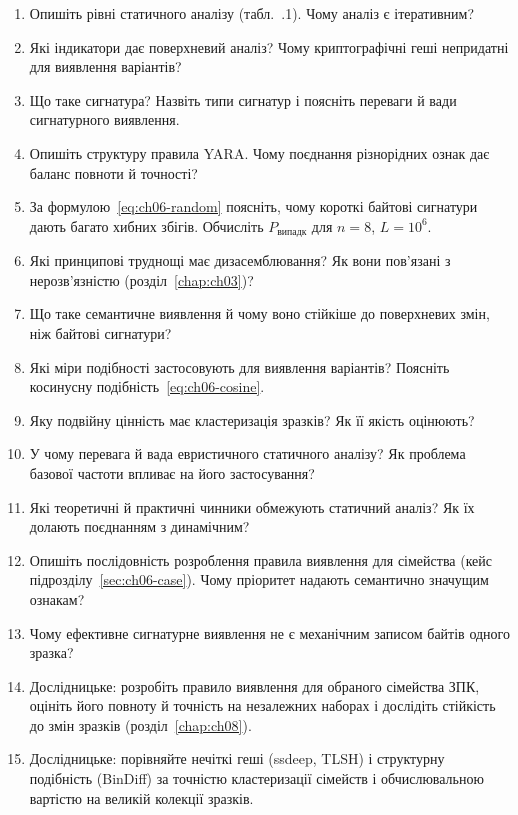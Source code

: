 \selfcheck
\begin{enumerate}
\item Опишіть рівні статичного аналізу (табл.~\thechapter.1). Чому аналіз є ітеративним?
\item Які індикатори дає поверхневий аналіз? Чому криптографічні геші непридатні для виявлення варіантів?
\item Що таке сигнатура? Назвіть типи сигнатур і поясніть переваги й вади сигнатурного виявлення.
\item Опишіть структуру правила YARA. Чому поєднання різнорідних ознак дає баланс повноти й точності?
\item За формулою~\eqref{eq:ch06-random} поясніть, чому короткі байтові сигнатури дають багато хибних збігів. Обчисліть $P_{\text{випадк}}$ для $n=8$, $L=10^6$.
\item Які принципові труднощі має дизасемблювання? Як вони пов'язані з нерозв'язністю (розділ~\ref{chap:ch03})?
\item Що таке семантичне виявлення й чому воно стійкіше до поверхневих змін, ніж байтові сигнатури?
\item Які міри подібності застосовують для виявлення варіантів? Поясніть косинусну подібність~\eqref{eq:ch06-cosine}.
\item Яку подвійну цінність має кластеризація зразків? Як її якість оцінюють?
\item У чому перевага й вада евристичного статичного аналізу? Як проблема базової частоти впливає на його застосування?
\item Які теоретичні й практичні чинники обмежують статичний аналіз? Як їх долають поєднанням з динамічним?
\item Опишіть послідовність розроблення правила виявлення для сімейства (кейс підрозділу~\ref{sec:ch06-case}). Чому пріоритет надають семантично значущим ознакам?
\item Чому ефективне сигнатурне виявлення не є механічним записом байтів одного зразка?
\item Дослідницьке: розробіть правило виявлення для обраного сімейства ЗПК, оцініть його повноту й точність на незалежних наборах і дослідіть стійкість до змін зразків (розділ~\ref{chap:ch08}).
\item Дослідницьке: порівняйте нечіткі геші (ssdeep, TLSH) і структурну подібність (BinDiff) за точністю кластеризації сімейств і обчислювальною вартістю на великій колекції зразків.
\end{enumerate}
